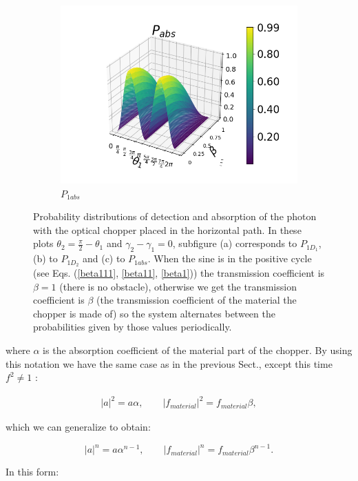 \documentclass[12pt]{book}
\begin{document}
\begin{figure}[t!]
\begin{subfigure}[b]{0.4\linewidth}
\includegraphics[width=\linewidth]{images/PAbs_v.png}
\caption{$P_{1abs}$}
\label{fig:BS1}
\end{subfigure}
\caption{Probability distributions of detection and absorption of the photon with the optical chopper placed in the horizontal path. In these plots $\theta_{2}=\frac{\pi}{2}-\theta_{1}$ and $\gamma_{2}-\gamma_{1}=0$, subfigure (a) corresponds to $P_{1D_{1}}$, (b) to $P_{1D_{2}}$ and (c) to $P_{1abs}$. When the sine is in the positive cycle (see Eqs. (\ref{beta111}, \ref{beta11}, \ref{beta1}))  the transmission coefficient is $\beta=1$ (there is no obstacle), otherwise we get the transmission coefficient is $\beta$ (the transmission coefficient of the material the chopper is made of) so the system alternates between the probabilities given by those values periodically.}
\label{P3chopper}
\end{figure}

where $\alpha$ is the absorption coefficient of the material part of the chopper. By using this notation we have the same case as in the previous Sect., except this time $f^2 \neq 1$ :

\begin{align}
|a|^2=a \alpha,\qquad |f_{material}|^2=f_{material} \beta,
\end{align}

which we can generalize to obtain:

\begin{equation}
|a|^n=a\alpha^{n-1},\qquad|f_{material}|^n=f_{material} \beta^{n-1}.
\end{equation}

In this form:
\end{document}
